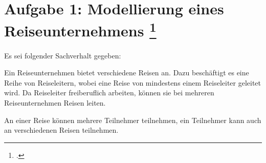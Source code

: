 \documentclass{lehramt-informatik-aufgabe}
\begin{document}
\section{Aufgabe 1: Modellierung eines Reiseunternehmens
\footcite{examen:46116:2010:03}}

Es sei folgender Sachverhalt gegeben:

Ein Reiseunternehmen bietet verschiedene Reisen an. Dazu beschäftigt es
eine Reihe von Reiseleitern, wobei eine Reise von mindestens einem
Reiseleiter geleitet wird. Da Reiseleiter freiberuflich arbeiten, können
sie bei mehreren Reiseunternehmen Reisen leiten.

An einer Reise können mehrere Teilnehmer teilnehmen, ein Teilnehmer kann
auch an verschiedenen Reisen teilnehmen.
\end{document}
